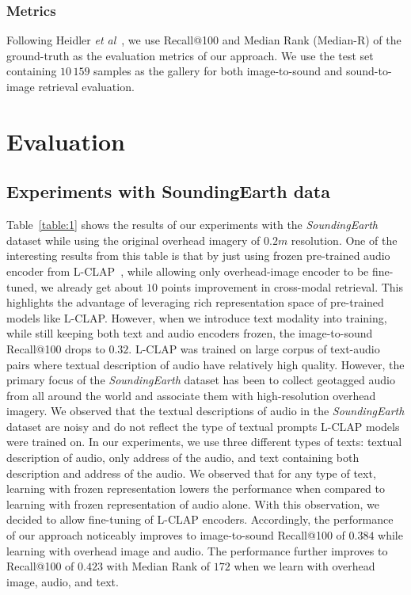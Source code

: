\documentclass{bmvc2k}
\def\etal{\emph{et al}\bmvaOneDot}
\begin{document}
\subsubsection{Metrics}
Following Heidler \etal~\cite{heidler2023self}, we use Recall@100 and Median Rank (Median-R) of the ground-truth as the evaluation metrics of our approach. We use the test set containing $10\,159$ samples as the gallery for both image-to-sound and sound-to-image retrieval evaluation.

\section{Evaluation}
\label{sec:evaluation}
\subsection{Experiments with SoundingEarth data}
Table~\ref{table:1} shows the results of our experiments with the {\em SoundingEarth} dataset while using the original overhead imagery of $0.2m$ resolution. One of the interesting results from this table is that by just using frozen pre-trained audio encoder from L-CLAP~\cite{laionclap2023}, while allowing only overhead-image encoder to be fine-tuned, we already get about $10$ points improvement in cross-modal retrieval. This highlights the advantage of leveraging rich representation space of pre-trained models like L-CLAP. However, when we introduce text modality into training, while still keeping both text and audio encoders frozen, the image-to-sound Recall@100 drops to $0.32$. L-CLAP was trained on large corpus of text-audio pairs where textual description of audio have relatively high quality. However, the primary focus of the {\em SoundingEarth} dataset has been to collect geotagged audio from all around the world and associate them with high-resolution overhead imagery. We observed that the textual descriptions of audio in the {\em SoundingEarth} dataset are noisy and do not reflect the type of textual prompts L-CLAP models were trained on. In our experiments, we use three different types of texts: textual description of audio, only address of the audio, and text containing both description and address of the audio. We observed that for any type of text, learning with frozen representation lowers the performance when compared to learning with frozen representation of audio alone. With this observation, we decided to allow fine-tuning of L-CLAP encoders. Accordingly, the performance of our approach noticeably improves to image-to-sound Recall@100 of $0.384$ while learning with overhead image and audio. The performance further improves to Recall@100 of $0.423$ with Median Rank of $172$ when we learn with overhead image, audio, and text. 
\end{document}

